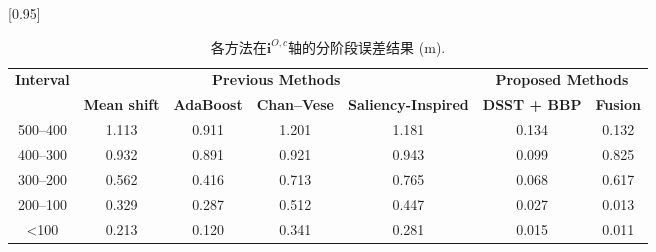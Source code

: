 \begin{table}[H]
	\centering
	\caption{各方法在$\mathbf{i}^{O,c}$轴的分阶段误差结果 (m).}
	\label{lab:algorithms_i}
	\scalebox{0.95}[0.95]{	\begin{tabular}{ccccccc}
			\toprule
			
			\multirow{2}{*}{\textbf{Interval}}\vspace{-2pt}
& \multicolumn{4}{c}{\textbf{Previous Methods}}                               & \multicolumn{2}{c}{\textbf{Proposed Methods}} \\ \cmidrule(lr){2-5} \cmidrule(lr){6-7} 
\multicolumn{1}{l}{} & \textbf{Mean shift}  & \textbf{AdaBoost}  & \textbf{Chan--Vese}  & \multicolumn{1}{c}{\textbf{Saliency-Inspired}} & \textbf{DSST + BBP}   & \textbf{Fusion} \\\midrule
			500--400      & 1.113       & 0.911       & 1.201       & \multicolumn{1}{c}{1.181}          & 0.134       & 0.132       \\
			400--300      & 0.932       & 0.891       & 0.921       & \multicolumn{1}{c}{0.943}          & 0.099       & 0.825       \\
			300--200      & 0.562       & 0.416       & 0.713       & \multicolumn{1}{c}{0.765}          & 0.068       & 0.617       \\
			200--100      & 0.329       & 0.287       & 0.512       & \multicolumn{1}{c}{0.447}          & 0.027       & 0.013       \\
			\textless100    & 0.213       & 0.120       & 0.341       & \multicolumn{1}{c}{0.281}          & 0.015       & 0.011       \\ \bottomrule
	\end{tabular}}
\end{table}
\unskip
